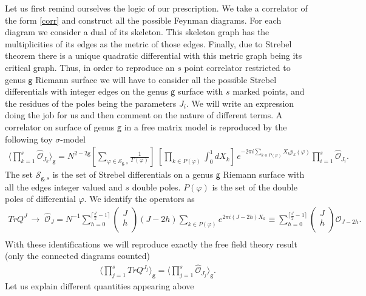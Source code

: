 \documentclass[11pt]{JHEP3}
\def\be{\begin{eqnarray}}
\def\ee{\end{eqnarray}}
\def\s{\sigma}
\def\vf{\varphi}
\def\s{\sigma}
\def\gg{\mathsf g }
\begin{document}
Let us first remind ourselves the logic
 of our prescription. We take a correlator of the form  \eqref{corr} and construct
all the possible Feynman diagrams. For each diagram we consider a dual of its skeleton. This 
skeleton graph has the multiplicities of its edges as the metric of those edges. Finally, due
to Strebel theorem there is a unique quadratic differential with this metric graph being its critical graph.
Thus, in order to reproduce an $s$ point correlator restricted to genus $\gg$ Riemann surface we
will have to consider all the possible Strebel differentials with integer edges on the genus $\gg$ surface with $s$ marked points,
and the residues of the poles being the parameters $J_i$. We will write an expression doing the 
job for us and then comment on the nature of different terms.
 A correlator on surface of genus $\gg$ in a free matrix model is reproduced by the following 
toy $\s$-model
\be\label{stringP}
\langle\prod_{k=1}^s\hat {\mathcal O}_{J_k}\rangle_\gg=N^{2-2\gg}\left[\sum_{\vf\in\mathcal S_{\gg,s}}\frac{1}{\Gamma(\vf)}\right]\; 
\left[\prod_{k\in P(\vf)} \int_0^1dX_k\right]\,
 e^{-2\pi i\sum_{k\in P(\vf)} X_k p_k(\vf)}\prod_{i=1}^s\hat {\mathcal O}_{J_i}.
\ee The set ${\mathcal S_{\gg,s}}$ is the set of Strebel differentials on
a genus $\gg$ Riemann surface with all the edges integer valued and $s$ double poles. $P(\vf)$ is the set of
the double poles of differential $\vf$.
 We identify the operators as
\be\label{op}
TrQ^J\,\to\; \hat{\mathcal O}_J=N^{-1}
\sum_{h=0}^{\lceil\frac{J}{2}-1\rceil}\left(\begin{array}{c}J\\h\\\end{array}\right)
(J-2h)\sum_{k\in P(\vf)} e^{2\pi i (J-2h) X_k}\equiv
\sum_{h=0}^{\lceil\frac{J}{2}-1\rceil}\left(\begin{array}{c}J\\h\\\end{array}\right)
{\mathcal O}_{J-2h}.\nonumber\\
\ee With these identifications we will reproduce exactly the free
field theory result (only the connected diagrams counted)
\be
\langle\prod_{j=1}^sTrQ^{J_j}\rangle_\gg=\langle\prod_{j=1}^s\hat{\mathcal O}_{J_j}\rangle_\gg.
\ee
Let us explain different quantities appearing above
\end{document}
